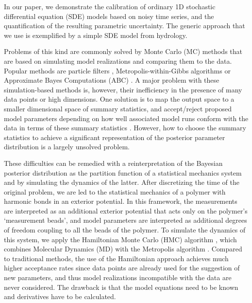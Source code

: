 \documentclass[11pt]{article}
\theoremstyle{definition}
\begin{document}
In our paper, we demonstrate the calibration of ordinary 1D stochastic differential equation (SDE) models based on noisy time series, and the quantification of the resulting parametric uncertainty. The generic approach that we use is exemplified by a simple SDE model from hydrology.

Problems of this kind are commonly solved by Monte Carlo (MC) methods that are based on simulating model realizations and comparing them to the data. Popular methods are particle filters \cite{chopin_2013_SMC2}, Metropolis-within-Gibbs algorithms \cite{tomassini_2009_smoothing, reichert_2009_timedepParameters} or Approximate Bayes Computations (ABC) \cite{marin_2012_ABC, Albert_2014_ABC}.
A major problem with these simulation-based methods is, however, their inefficiency in the presence of many data points or high dimensions. One solution is to map the output space to a smaller dimensional space of summary statistics, and accept/reject proposed model parameters depending on how well associated model runs conform with the data in terms of these summary statistics \cite{Fearnhead_2012_ABC}. However, how to choose the summary statistics to achieve a significant representation of the posterior parameter distribution is a largely unsolved problem.

These difficulties can be remedied with a reinterpretation of the Bayesian posterior distribution as the partition function of a statistical mechanics system and by simulating the dynamics of the latter.
After discretizing the time of the original problem, we are led to the statistical mechanics of a polymer %
with harmonic bonds in an exterior potential. In this framework, the measurements are interpreted as an additional exterior potential that acts only on the polymer's `measurement beads', and model parameters are interpreted as additional degrees of freedom coupling to all the beads of the polymer.
To simulate the dynamics of this system, we apply the Hamiltonian Monte Carlo (HMC) algorithm \cite{duane_1987}, which combines Molecular Dynamics (MD) \cite{alder_1959_MD, rahman_1964_MD} with the Metropolis algorithm  \cite{metropolis_1953}.
Compared to traditional methods, the use of the Hamiltonian approach achieves much higher acceptance rates since data points are already used for the suggestion of new parameters, and thus model realizations incompatible with the data are never considered. The drawback is that the model equations need to be known and derivatives have to be calculated.
\end{document}
